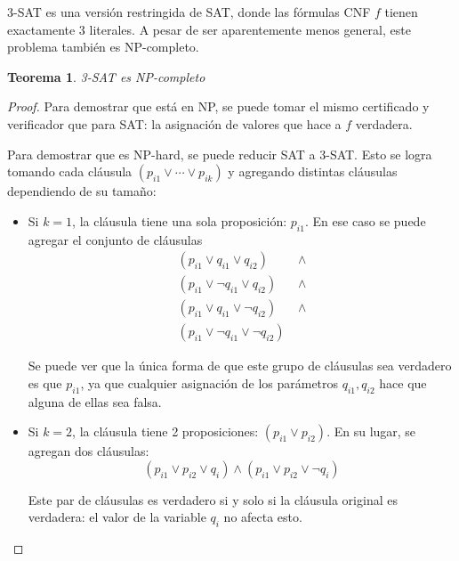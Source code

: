 \documentclass[a4paper]{report}
\newtheorem*{theorem*}{Teorema}
\begin{document}
3-SAT es una versión restringida de SAT, donde las fórmulas CNF $f$ tienen exactamente 3 literales. A pesar de ser aparentemente menos general, este problema también es NP-completo.
\begin{theorem*}
    3-SAT es NP-completo
\end{theorem*}
\begin{proof}
    Para demostrar que está en NP, se puede tomar el mismo certificado y verificador que para SAT: la asignación de valores que hace a $f$ verdadera.

    Para demostrar que es NP-hard, se puede reducir SAT a 3-SAT. Esto se logra tomando cada cláusula $(p_{i1} \lor \cdots \lor p_{ik})$ y agregando distintas cláusulas dependiendo de su tamaño:
    \begin{itemize}
        \item Si $k = 1$, la cláusula tiene una sola proposición: $p_{i1}$. En ese caso se puede agregar el conjunto de cláusulas
              \begin{align*}
                  (p_{i1} \lor q_{i1} \lor q_{i2})\            & \land \\
                  (p_{i1} \lor \neg q_{i1} \lor q_{i2})\       & \land \\
                  (p_{i1} \lor q_{i1} \lor \neg q_{i2})\       & \land \\
                  (p_{i1} \lor \neg q_{i1} \lor \neg q_{i2})\  &
              \end{align*}

              Se puede ver que la única forma de que este grupo de cláusulas sea verdadero es que $p_{i1}$, ya que cualquier asignación de los parámetros $q_{i1}, q_{i2}$ hace que alguna de ellas sea falsa.

        \item Si $k = 2$, la cláusula tiene 2 proposiciones: $(p_{i1} \lor p_{i2})$. En su lugar, se agregan dos cláusulas:
              $$(p_{i1} \lor p_{i2} \lor q_i) \land (p_{i1} \lor p_{i2} \lor \neg q_i)$$

              Este par de cláusulas es verdadero si y solo si la cláusula original es verdadera: el valor de la variable $q_i$ no afecta esto.


\end{itemize}
\end{proof}
\end{document}
